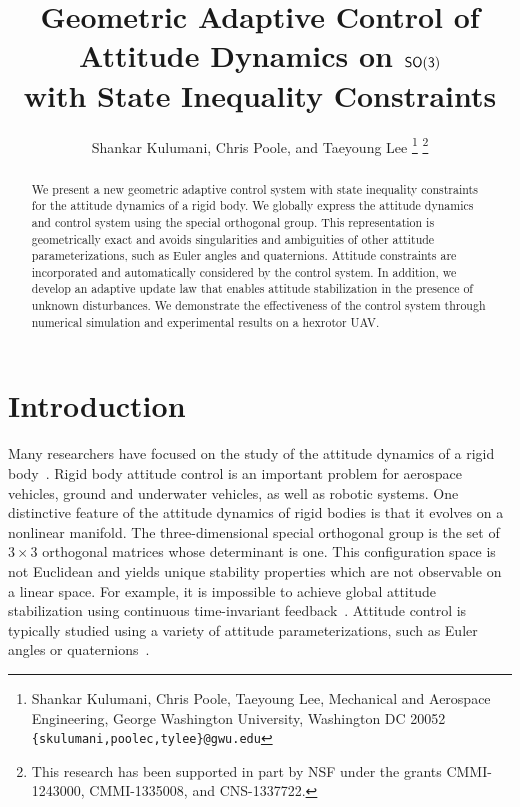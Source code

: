 \documentclass[letterpaper, 10 pt, conference]{ieeeconf}  %
\title{\LARGE \bf
Geometric Adaptive Control of Attitude Dynamics on $\mathsf{SO(3)}$\\ with State Inequality Constraints}
\author{Shankar Kulumani, Chris Poole, and Taeyoung Lee
\thanks{Shankar Kulumani, Chris Poole, Taeyoung Lee, Mechanical and Aerospace Engineering, George Washington University, Washington DC 20052 {\tt \{skulumani,poolec,tylee\}@gwu.edu}}
\thanks{This research has been supported in part by NSF under the grants CMMI-1243000, CMMI-1335008, and CNS-1337722.}
}
\begin{document}
\maketitle
\thispagestyle{empty}
\pagestyle{empty}


\begin{abstract}
We present a new geometric adaptive control system with state inequality constraints for the attitude dynamics of a rigid body.
We globally express the attitude dynamics and control system using the special orthogonal group. 
This representation is geometrically exact and avoids singularities and ambiguities of other attitude parameterizations, such as Euler angles and quaternions.
Attitude constraints are incorporated and automatically considered by the control system.
In addition, we develop an adaptive update law that enables attitude stabilization in the presence of unknown disturbances. 
We demonstrate the effectiveness of the control system through numerical simulation and experimental results on a hexrotor UAV.

\end{abstract}


\section{Introduction}\label{sec:intro}
Many researchers have focused on the study of the attitude dynamics of a rigid body~\cite{hughes2004,wertz1978}.
Rigid body attitude control is an important problem for aerospace vehicles, ground and underwater vehicles, as well as robotic systems.
One distinctive feature of the attitude dynamics of rigid bodies is that it evolves on a nonlinear manifold.
The three-dimensional special orthogonal group is the set of \( 3 \times 3 \) orthogonal matrices whose determinant is one.
This configuration space is not Euclidean and yields unique stability properties which are not observable on a linear space.
For example, it is impossible to achieve global attitude stabilization using continuous time-invariant feedback~\cite{bhat2000}.
Attitude control is typically studied using a variety of attitude parameterizations, such as Euler angles or quaternions~\cite{shuster1993}.

\end{document}
